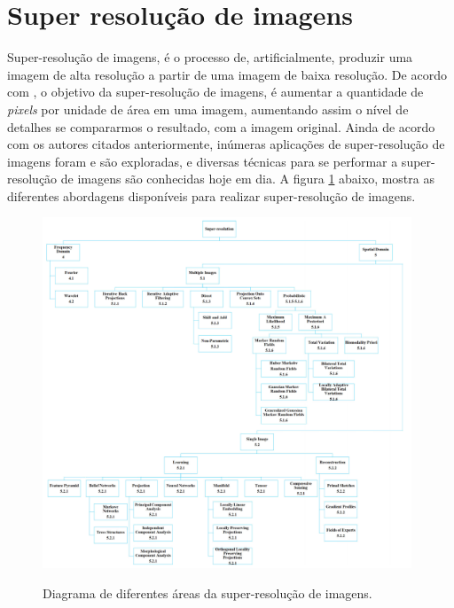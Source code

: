 \section{Super resolução de imagens}
\label{sec:sisr}

Super-resolução de imagens, é o processo de, artificialmente, produzir uma imagem de alta resolução a partir de uma imagem de baixa resolução. De acordo com \cite{nasrollahi_super-resolution_2014}, o objetivo da super-resolução de imagens, é aumentar a quantidade de \textit{pixels} por unidade de área em uma imagem, aumentando assim o nível de detalhes se compararmos o resultado, com a imagem original. Ainda de acordo com os autores citados anteriormente, inúmeras aplicações de super-resolução de imagens foram e são exploradas, e diversas técnicas para se performar a super-resolução de imagens são conhecidas hoje em dia. A figura \ref{fig:super-resolucao:fig11} abaixo, mostra as diferentes abordagens disponíveis para realizar super-resolução de imagens. 

\begin{figure}
    \centering
    \caption{Diagrama de diferentes áreas da super-resolução de imagens.}
    \includegraphics[width=11cm]{fig/SR-Taxidermy.png}
    \label{fig:super-resolucao:fig11}
\end{figure}

